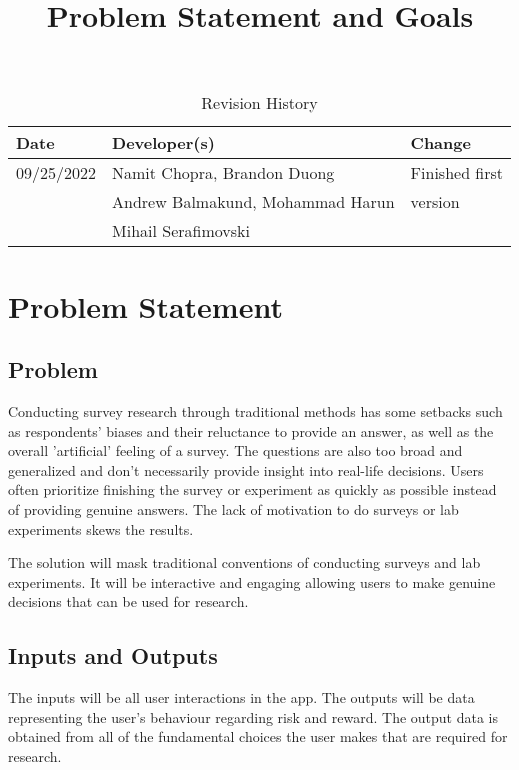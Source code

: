 \documentclass{article}
\title{Problem Statement and Goals\\\progname}
\author{\authname}
\date{}
\begin{document}
\maketitle

\begin{table}[hp]
\caption{Revision History} \label{TblRevisionHistory}
\begin{tabularx}{\textwidth}{llX}
\toprule
\textbf{Date} & \textbf{Developer(s)} & \textbf{Change}\\
\midrule
 09/25/2022 & Namit Chopra, Brandon Duong  & Finished first \\
 & Andrew Balmakund, Mohammad Harun & version\\
 & Mihail Serafimovski & \\
\bottomrule
\end{tabularx}
\end{table}

\section{Problem Statement}

\subsection{Problem}
Conducting survey research through traditional methods has some setbacks such as respondents' biases and their reluctance to provide an answer, as well as the overall 'artificial' feeling of a survey. The questions are also too broad and generalized and don't necessarily provide insight into real-life decisions. Users often prioritize finishing the survey or experiment as quickly as possible instead of providing genuine answers. The lack of motivation to do surveys or lab experiments skews the results.

The solution will mask traditional conventions of conducting surveys and lab experiments. It will be interactive and engaging allowing users to make genuine decisions that can be used for research.

\subsection{Inputs and Outputs}
The inputs will be all user interactions in the app. The outputs will be data representing the user's behaviour regarding risk and reward. The output data is obtained from all of the fundamental choices the user makes that are required for research. 
\end{document}
